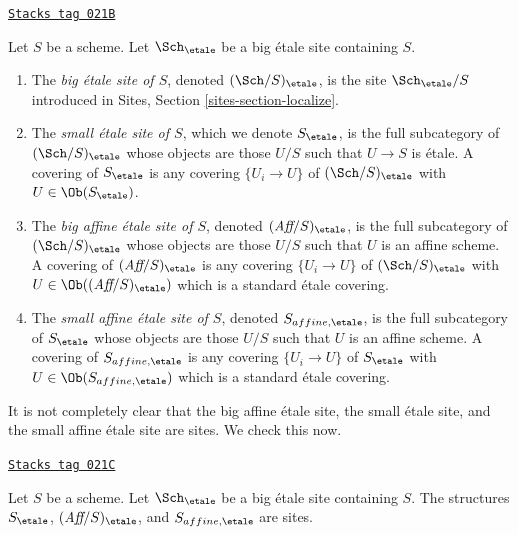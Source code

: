 \begin{definition}
\label{topologies-definition-big-small-etale}
\href{https://stacks.math.columbia.edu/tag/021B}{\texttt{Stacks tag 021B}}

Let $S$ be a scheme. Let $\Sch_\etale$ be a big \'etale
site containing $S$.
\begin{enumerate}
\item The {\it big \'etale site of $S$}, denoted
$(\Sch/S)_\etale$, is the site
$\Sch_\etale/S$ introduced in
Sites, Section \ref{sites-section-localize}.
\item The {\it small \'etale site of $S$}, which we denote
$S_\etale$, is the full subcategory of
$(\Sch/S)_\etale$
whose objects are those $U/S$ such that $U \to S$ is \'etale.
A covering of $S_\etale$ is any covering $\{U_i \to U\}$ of
$(\Sch/S)_\etale$ with $U \in \Ob(S_\etale)$.
\item The {\it big affine \'etale site of $S$}, denoted
$(\textit{Aff}/S)_\etale$, is the full subcategory of
$(\Sch/S)_\etale$ whose objects are those $U/S$
such that $U$ is an affine scheme.
A covering of $(\textit{Aff}/S)_\etale$ is any covering
$\{U_i \to U\}$ of $(\Sch/S)_\etale$ with $U \in \Ob((\textit{Aff}/S)_\etale)$
which is a standard \'etale covering.
\item The {\it small affine \'etale site of $S$}, denoted
$S_{affine, \etale}$, is the full subcategory of $S_\etale$
whose objects are those $U/S$ such that $U$ is an affine scheme.
A covering of $S_{affine, \etale}$ is any covering $\{U_i \to U\}$
of $S_\etale$ with $U \in \Ob(S_{affine, \etale})$ which is a standard
\'etale covering.
\end{enumerate}
\end{definition}

It is not completely clear that the big affine \'etale site,
the small \'etale site, and the small affine \'etale site are sites.
We check this now.

\begin{lemma}
\label{topologies-lemma-verify-site-etale}
\href{https://stacks.math.columbia.edu/tag/021C}{\texttt{Stacks tag 021C}}

Let $S$ be a scheme. Let $\Sch_\etale$ be a big \'etale
site containing $S$.
The structures $S_\etale$, $(\textit{Aff}/S)_\etale$, and $S_{affine, \etale}$
are sites.
\end{lemma}

